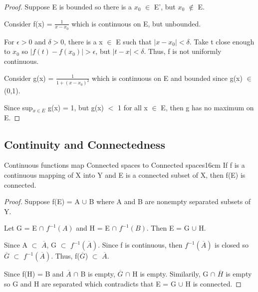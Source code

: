     \begin{proof}
        Suppose E is bounded so there is a $x_0$ $\in$ E', but $x_0$ $\not \in$ E.

        Consider f(x) = $\frac{1}{x - x_0}$ which is continuous on E, but unbounded.

        For $\epsilon > 0$ and $\delta > 0$, there is a x $\in$ E such that
        $|x - x_0| < \delta$.
        Take t close enough to $x_0$ so $|f(t) - f(x_0)| > \epsilon$,
        but $|t - x| < \delta$.
        Thus, f is not uniformly continuous.

        \vspace{0.2cm}

        Consider g(x) = $\frac{1}{1 + (x - x_0)^2}$ which is continuous on E
        and bounded since g(x) $\in$ (0,1).

        Since sup$_{x \in E}$ g(x) = 1, but g(x) $<$ 1 for all x $\in$ E, then
        g has no maximum on E.
    \end{proof}

    \vspace{0.5cm}





\subsection{ Continuity and Connectedness }

    \begin{wtheorem}{Continuous functions map Connected spaces
    to Connected spaces}{16cm}
        If f is a continuous mapping of X into Y and E is a connected
        subset of X, then f(E) is connected.
    \end{wtheorem}

    \begin{proof}
        Suppose f(E) = A $\cup$ B where A and B are nonempty separated
        subsets of Y.
        
        Let G = E $\cap$ $f^{-1}(A)$ and H = E $\cap$ $f^{-1}(B)$.
        Then E = G $\cup$ H.

        Since A $\subset$ $\overline{A}$, G $\subset$ $f^{-1}(\overline{A})$.
        Since f is continuous, then $f^{-1}(\overline{A})$ is closed so
        $\overline{G}$ $\subset$ $f^{-1}(\overline{A})$.
        Thus, f($\overline{G}$) $\subset$ $\overline{A}$.

        Since f(H) = B and $\overline{A}$ $\cap$ B is empty,
        $\overline{G}$ $\cap$ H is empty.
        Similarily, G $\cap$ $\overline{H}$ is empty so G and H are separated
        which contradicts that E = G $\cup$ H is connected.
    \end{proof}


